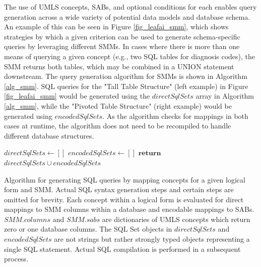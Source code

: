 \documentclass[../main.tex]{subfiles}
\begin{document}
The use of UMLS concepts, SABs, and optional conditions for each enables query generation across a wide variety of potential data models and database schema. An example of this can be seen in Figure \ref{fig_leafai_smm}, which shows strategies by which a given criterion can be used to generate schema-specific queries by leveraging different SMMs. In cases where there is more than one means of querying a given concept (e.g., two SQL tables for diagnosis codes), the SMM returns both tables, which may be combined in a UNION statement downstream. The query generation algorithm for SMMs is shown in Algorithm \ref{alg_smm}. SQL queries for the "Tall Table Structure" (left example) in Figure \ref{fig_leafai_smm} would be generated using the $directSqlSets$ array in Algorithm \ref{alg_smm}, while the "Pivoted Table Structure" (right example) would be generated using $encodedSqlSets$. As the algorithm checks for mappings in both cases at runtime, the algorithm does not need to be recompiled to handle different database structures.


\begin{algorithm}
\DontPrintSemicolon
$directSqlSets \gets []$ 
$encodedSqlSets \gets []$ 
\BlankLine
{}
$\textbf{return}$ $directSqlSets \cup encodedSqlSets$\;
\caption{Algorithm for generating SQL queries by mapping concepts for a given logical form and SMM. Actual SQL syntax generation steps and certain steps are omitted for brevity. Each concept within a logical form is evaluated for direct mappings to SMM columns within a database and encodable mappings to SABs. $SMM.columns$ and $SMM.sabs$ are dictionaries of UMLS concepts which return zero or one database columns. The SQL Set objects in $directSqlSets$ and $encodedSqlSets$ are not strings but rather strongly typed objects representing a single SQL statement. Actual SQL compilation is performed in a subsequent process.}\label{alg_smm}
\end{algorithm}
\end{document}
